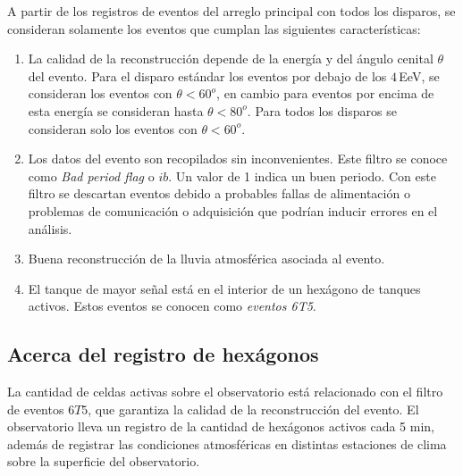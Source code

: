 A partir de los registros de eventos del arreglo principal con todos los disparos, se consideran solamente los eventos que cumplan las siguientes características:

    \begin{enumerate}
      \item La calidad de la reconstrucción depende de la energía y del ángulo cenital $\theta$ del evento.  Para el disparo estándar los eventos por debajo de los $4\,$EeV, se consideran los eventos con $\theta < 60^o$, en cambio para eventos por encima de esta energía se consideran hasta $\theta < 80^o$. Para todos los disparos se consideran solo los eventos con $\theta<60^o$.
      \item Los datos del evento son recopilados sin inconvenientes. Este filtro se conoce como \emph{Bad period flag} o $ib$. Un valor de 1 indica un buen periodo. Con este filtro se descartan eventos debido a probables fallas de alimentación o problemas de comunicación o adquisición que podrían inducir errores en el análisis.
      \item Buena reconstrucción de la lluvia atmosférica asociada al evento.
      \item El tanque de mayor señal está en el interior de un hexágono de tanques activos. Estos eventos se conocen como \textit{eventos 6T5}.
    \end{enumerate}


\subsection{Acerca del registro de hexágonos}\label{hexagonos_rate}

La cantidad de celdas  activas sobre el observatorio está relacionado con el filtro de eventos $6T5$, que garantiza la calidad de la reconstrucción del evento. El observatorio lleva un registro de la cantidad de hexágonos activos cada 5 min, además de registrar las condiciones atmosféricas en distintas estaciones de clima sobre la superficie del observatorio. 






